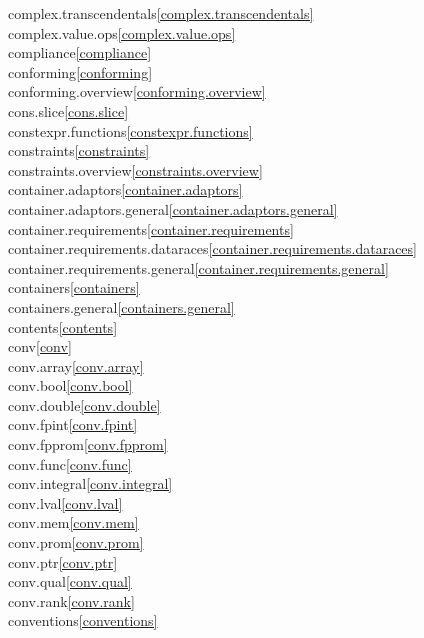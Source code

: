 \begin{multicols}{2}
complex.transcendentals\quad\ref{complex.transcendentals}\\
complex.value.ops\quad\ref{complex.value.ops}\\
compliance\quad\ref{compliance}\\
conforming\quad\ref{conforming}\\
conforming.overview\quad\ref{conforming.overview}\\
cons.slice\quad\ref{cons.slice}\\
constexpr.functions\quad\ref{constexpr.functions}\\
constraints\quad\ref{constraints}\\
constraints.overview\quad\ref{constraints.overview}\\
container.adaptors\quad\ref{container.adaptors}\\
container.adaptors.general\quad\ref{container.adaptors.general}\\
container.requirements\quad\ref{container.requirements}\\
container.requirements.dataraces\quad\ref{container.requirements.dataraces}\\
container.requirements.general\quad\ref{container.requirements.general}\\
containers\quad\ref{containers}\\
containers.general\quad\ref{containers.general}\\
contents\quad\ref{contents}\\
conv\quad\ref{conv}\\
conv.array\quad\ref{conv.array}\\
conv.bool\quad\ref{conv.bool}\\
conv.double\quad\ref{conv.double}\\
conv.fpint\quad\ref{conv.fpint}\\
conv.fpprom\quad\ref{conv.fpprom}\\
conv.func\quad\ref{conv.func}\\
conv.integral\quad\ref{conv.integral}\\
conv.lval\quad\ref{conv.lval}\\
conv.mem\quad\ref{conv.mem}\\
conv.prom\quad\ref{conv.prom}\\
conv.ptr\quad\ref{conv.ptr}\\
conv.qual\quad\ref{conv.qual}\\
conv.rank\quad\ref{conv.rank}\\
conventions\quad\ref{conventions}\\

\end{multicols}
